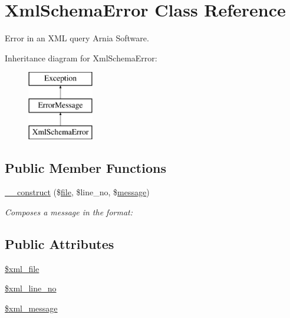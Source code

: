 \hypertarget{classXmlSchemaError}{\section{Xml\+Schema\+Error Class Reference}
\label{classXmlSchemaError}
}


Error in an X\+M\+L query  Arnia Software.  


Inheritance diagram for Xml\+Schema\+Error\+:\begin{figure}[H]
\begin{center}
\leavevmode
\includegraphics[height=3.000000cm]{classXmlSchemaError}
\end{center}
\end{figure}
\subsection*{Public Member Functions}
\begin{DoxyCompactItemize}
\item 
\hyperlink{classXmlSchemaError_ac4b4c8c9edd7096365874717e16789ad}{\+\_\+\+\_\+construct} (\$\hyperlink{classfile}{file}, \$line\+\_\+no, \$\hyperlink{classmessage}{message})
\begin{DoxyCompactList}\small\item\em Composes a message in the format\+: \end{DoxyCompactList}\end{DoxyCompactItemize}
\subsection*{Public Attributes}
\begin{DoxyCompactItemize}
\item 
\hyperlink{classXmlSchemaError_a646a6373c1efb61d612ad12f39d110ef}{\$xml\+\_\+file}
\item 
\hyperlink{classXmlSchemaError_a2094eb442ad426768d6bc9413bf5c27a}{\$xml\+\_\+line\+\_\+no}
\item 
\hyperlink{classXmlSchemaError_acbea6440352e9b0fb6d3f7e37528f0de}{\$xml\+\_\+message}
\end{DoxyCompactItemize}


